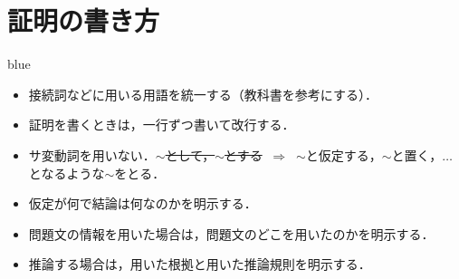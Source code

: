 \documentclass[11pt,dvipdfmx]{jreport}
\begin{document}
\appendix

\section{証明の書き方}
\begin{color}{blue}
\begin{itemize}
 \item 接続詞などに用いる用語を統一する（教科書を参考にする）．
 \item 証明を書くときは，一行ずつ書いて改行する．
 \item サ変動詞を用いない．\sout{$\sim$として，$\sim$とする} $\ \Longrightarrow \ $ $\sim$と仮定する，$\sim$と置く，$\dots$となるような$\sim$をとる．
 \item 仮定が何で結論は何なのかを明示する．
 \item 問題文の情報を用いた場合は，問題文のどこを用いたのかを明示する．
 \item 推論する場合は，用いた根拠と用いた推論規則を明示する．
\end{itemize}
\end{color}


\end{document}
